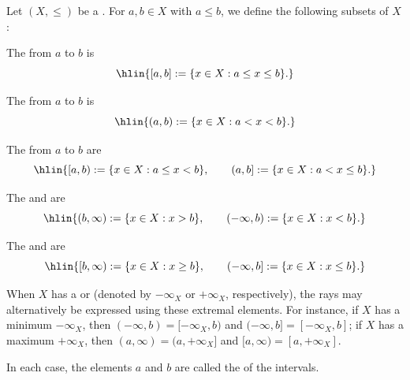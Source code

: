 \begin{definition} \label{definition:intervals_in_a_partially_ordered_set}
    Let $(X, \leq)$ be a . For $a, b \in X$ with $a \leq b$, we define the following subsets of $X$:

    The  from $a$ to $b$ is
    $$\hlin{[a, b] := \{x \in X : a \leq x \leq b\}.}$$

    The  from $a$ to $b$ is
    $$\hlin{(a, b) := \{x \in X : a < x < b\}.}$$

    The  from $a$ to $b$ are
    $$\hlin{[a, b) := \{x \in X : a \leq x < b\}, \qquad (a, b] := \{x \in X : a < x \leq b\}.}$$

    The  and  are
    $$\hlin{(b, \infty) := \{x \in X : x > b\}, \qquad (-\infty, b) := \{x \in X : x < b\}.}$$

    The  and  are
    $$\hlin{[b, \infty) := \{x \in X : x \geq b\}, \qquad (-\infty, b] := \{x \in X : x \leq b\}.}$$

    When $X$ has a  or  (denoted by $-\infty_X$ or $+\infty_X$, respectively), the rays may alternatively be expressed using these extremal elements. For instance, if $X$ has a minimum $-\infty_X$, then $(-\infty, b) = [-\infty_X, b)$ and $(-\infty, b] = [-\infty_X, b]$; if $X$ has a maximum $+\infty_X$, then $(a, \infty) = (a, +\infty_X]$ and $[a, \infty) = [a, +\infty_X]$.

    In each case, the elements $a$ and $b$ are called the  of the intervals.
\end{definition}
